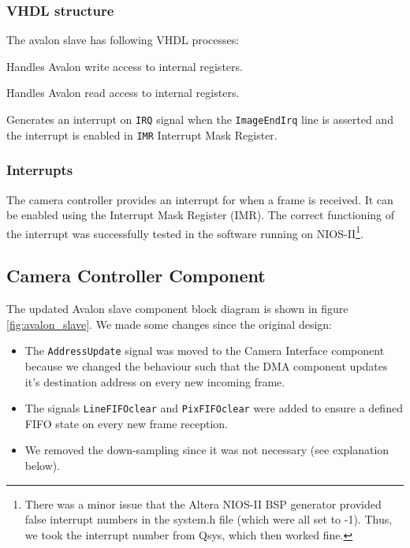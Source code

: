 \documentclass{article}
\begin{document}
\subsubsection{VHDL structure}

The avalon slave has following VHDL processes:
\begin{description}[align=right, leftmargin=*,labelindent=2cm]
\item[pRegWr] Handles Avalon write access to internal registers.
\item[pRegRd] Handles Avalon read access to internal registers.
\item[pInt] Generates an interrupt on \verb'IRQ' signal when the \verb'ImageEndIrq' line is asserted and the interrupt is enabled in \verb'IMR' Interrupt Mask Register.
\end{description}

\subsubsection{Interrupts}
The camera controller provides an interrupt for when a frame is received. It can be enabled using the Interrupt Mask Register (IMR). The correct functioning of the interrupt was successfully tested in the software running on NIOS-II\footnote{There was a minor issue that the Altera NIOS-II BSP generator provided false interrupt numbers in the system.h file (which were all set to -1). Thus, we took the interrupt number from Qsys, which then worked fine.}.

\subsection{Camera Controller Component}
The updated Avalon slave component block diagram is shown in figure \ref{fig:avalon_slave}. 
We made some changes since the original design:
\begin{itemize}
    \item The \verb'AddressUpdate' signal was moved to the Camera Interface component because we changed the behaviour such that the DMA component updates it's destination address on every new incoming frame.
    \item The signals \verb'LineFIFOclear' and \verb'PixFIFOclear' were added to ensure a defined FIFO state on every new frame reception.
    \item We removed the down-sampling since it was not necessary (see explanation below).
\end{itemize}
\end{document}
